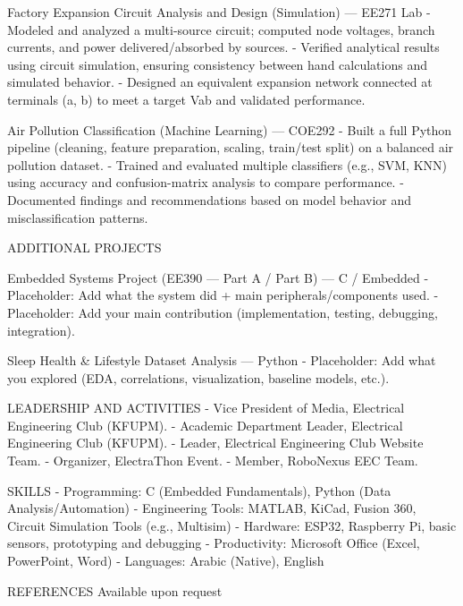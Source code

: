 Factory Expansion Circuit Analysis and Design (Simulation) — EE271 Lab
- Modeled and analyzed a multi-source circuit; computed node voltages, branch currents, and power delivered/absorbed by sources.
- Verified analytical results using circuit simulation, ensuring consistency between hand calculations and simulated behavior.
- Designed an equivalent expansion network connected at terminals (a, b) to meet a target Vab and validated performance.

Air Pollution Classification (Machine Learning) — COE292
- Built a full Python pipeline (cleaning, feature preparation, scaling, train/test split) on a balanced air pollution dataset.
- Trained and evaluated multiple classifiers (e.g., SVM, KNN) using accuracy and confusion-matrix analysis to compare performance.
- Documented findings and recommendations based on model behavior and misclassification patterns.

ADDITIONAL PROJECTS

Embedded Systems Project (EE390 — Part A / Part B) — C / Embedded
- Placeholder: Add what the system did + main peripherals/components used.
- Placeholder: Add your main contribution (implementation, testing, debugging, integration).

Sleep Health & Lifestyle Dataset Analysis — Python
- Placeholder: Add what you explored (EDA, correlations, visualization, baseline models, etc.).

LEADERSHIP AND ACTIVITIES
- Vice President of Media, Electrical Engineering Club (KFUPM).
- Academic Department Leader, Electrical Engineering Club (KFUPM).
- Leader, Electrical Engineering Club Website Team.
- Organizer, ElectraThon Event.
- Member, RoboNexus EEC Team.

SKILLS
- Programming: C (Embedded Fundamentals), Python (Data Analysis/Automation)
- Engineering Tools: MATLAB, KiCad, Fusion 360, Circuit Simulation Tools (e.g., Multisim)
- Hardware: ESP32, Raspberry Pi, basic sensors, prototyping and debugging
- Productivity: Microsoft Office (Excel, PowerPoint, Word)
- Languages: Arabic (Native), English

REFERENCES
Available upon request